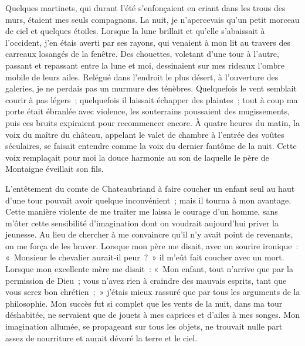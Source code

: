
{Quelques martinets, qui durant l'été s'enfonçaient en criant dans les
trous des murs, étaient mes seuls compagnons. La nuit, je
n'apercevais qu'un petit morceau de ciel et quelques étoiles. Lorsque
la lune brillait et qu'elle s'abaissait à l'occident, j'en étais
averti par ses rayons, qui venaient à mon lit au travers des carreaux
losangés de la fenêtre. Des chouettes, voletant d'une tour à l'autre,
passant et repassant entre la lune et moi, dessinaient sur mes
rideaux l'ombre mobile de leurs ailes. Relégué dans l'endroit le plus
désert, à l'ouverture des galeries, je ne perdais pas un murmure des
ténèbres. Quelquefois le vent semblait courir à pas légers~;
quelquefois il laissait échapper des plaintes~; tout à coup ma porte
était ébranlée avec violence, les souterrains poussaient des
mugissements, puis ces bruits expiraient pour recommencer encore. À
quatre heures du matin, la voix du maître du château, appelant le
valet de chambre à l'entrée des voûtes séculaires, se faisait
entendre comme la voix du dernier fantôme de la nuit. Cette voix
remplaçait pour moi la douce harmonie au son de laquelle le père de
Montaigne éveillait son fils.

L'entêtement du comte de Chateaubriand à faire coucher un enfant seul
au haut d'une tour pouvait avoir quelque inconvénient~; mais il
tourna à mon avantage. Cette manière violente de me traiter me laissa
le courage d'un homme, sans m'ôter cette sensibilité d'imagination
dont on voudrait aujourd'hui priver la jeunesse. Au lieu de chercher
à me convaincre qu'il n'y avait point de revenants, on me força de
les braver. Lorsque mon père me disait, avec un sourire ironique~:
«~Monsieur le chevalier aurait-il peur~?~» il m'eût fait coucher avec
un mort. Lorsque mon excellente mère me disait~: «~Mon enfant, tout
n'arrive que par la permission de Dieu~; vous n'avez rien à craindre
des mauvais esprits, tant que vous serez bon chrétien~;~» j'étais
mieux rassuré que par tous les arguments de la philosophie. Mon
succès fut si complet que les vents de la nuit, dans ma tour
déshabitée, ne servaient que de jouets à mes caprices et d'ailes à
mes songes. Mon imagination allumée, se propageant sur tous les
objets, ne trouvait nulle part assez de nourriture et aurait dévoré
la terre et le ciel.
}

